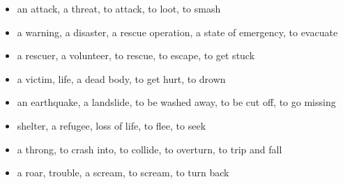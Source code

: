 \begin{itemize}
\raggedright
  \item an attack, a threat, to attack, to loot, to smash
  \item a warning, a disaster, a rescue operation, a state of emergency, to evacuate
  \item a rescuer, a volunteer, to rescue, to escape, to get stuck
  \item a victim, life, a dead body, to get hurt, to drown
  \item an earthquake, a landslide, to be washed away, to be cut off, to go missing
  \item shelter, a refugee, loss of life, to flee, to seek
  \item a throng, to crash into, to collide, to overturn, to trip and fall
  \item a roar, trouble, a scream, to scream, to turn back
\end{itemize}

